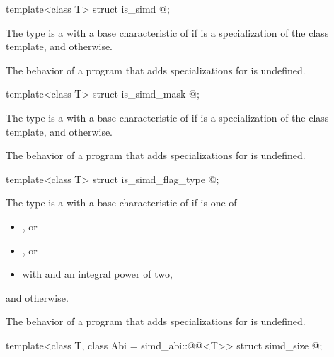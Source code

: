\begin{itemdecl}
template<class T> struct is_simd { @\seebelow@ };
\end{itemdecl}

\begin{itemdescr}
\pnum
The type  is a  with a base characteristic of  if  is a specialization of the  class template, and  otherwise.

\pnum
The behavior of a program that adds specializations for  is undefined.
\end{itemdescr}

\begin{itemdecl}
template<class T> struct is_simd_mask { @\seebelow@ };
\end{itemdecl}

\begin{itemdescr}
\pnum
The type  is a  with a base characteristic of  if  is a specialization of the  class template, and  otherwise.

\pnum
The behavior of a program that adds specializations for  is undefined.
\end{itemdescr}

\begin{itemdecl}
template<class T> struct is_simd_flag_type { @\seebelow@ };
\end{itemdecl}

\begin{itemdescr}
\pnum
The type  is a  with a base characteristic of  if  is one of
\begin{itemize}
  \item {}, or
  \item {}, or
  \item {} with  and  an integral power of two,
\end{itemize}
and  otherwise.

\pnum
The behavior of a program that adds specializations for  is undefined.
\end{itemdescr}

\begin{itemdecl}
template<class T, class Abi = simd_abi::@@<T>> struct simd_size { @\seebelow@ };
\end{itemdecl}

